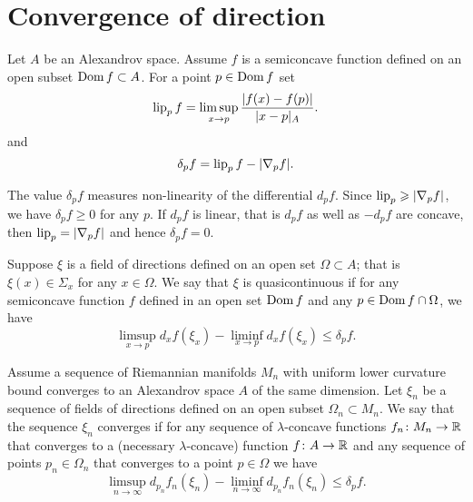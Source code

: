 \section{Convergence of direction}

Let $A$ be an Alexandrov space.
Assume $f$ is a semiconcave function defined on an open subset $\mathop{\rm Dom} f\subset A$.
For a point $p\in \mathop{\rm Dom} f$ set
\[\operatorname{\rm lip}_pf=\limsup_{x\to p} \frac{|f(x)-f(p)|}{|x-p|_A}.\]
and 
\[\delta_pf=\operatorname{\rm lip}_pf-|\nabla_p f|.\]

The value $\delta_pf$ measures non-linearity of the differential $d_pf$.
Since $\lip_p\zz\ge |\nabla_p f|$, we have $\delta_pf\ge 0$ for any $p$.
If $d_pf$ is linear, that is $d_pf$ as well as $-d_pf$ are concave,
then $\operatorname{\rm lip}_p= |\nabla_p f|$ and hence $\delta_pf=0$.

Suppose $\xi$ is a field of directions defined on an open set $\Omega\subset A$;
that is $\xi(x)\in\Sigma_x$ for any $x\in \Omega$.
We say that $\xi$ is quasicontinuous if for any semiconcave function $f$ defined in an open set $\mathop{\rm Dom} f$ and any $p\in \mathop{\rm Dom} f\cap \Omega$, we have
\[\limsup_{x\to p} d_xf(\xi_x)-\liminf_{x\to p} d_xf(\xi_x)\le \delta_pf.\] 

Assume a sequence of Riemannian manifolds $M_n$ with uniform lower curvature bound converges to an Alexandrov space $A$ of the same dimension.
Let $\xi_n$ be a sequence of fields of directions defined on an open subset $\Omega_n\subset M_n$.
We say that the sequence $\xi_n$ converges if for any sequence of $\lambda$-concave functions $f_n\colon M_n\to \mathbb{R}$ that converges to a (necessary $\lambda$-concave) function $f\colon A\to \mathbb{R}$ and any sequence of points $p_n\in \Omega_n$ that converges to a point $p\in \Omega$ we have
\[\limsup_{n\to \infty} d_{p_n}f_n(\xi_n)-\liminf_{n\to \infty} d_{p_n}f_n(\xi_n)\le \delta_p f.\]


